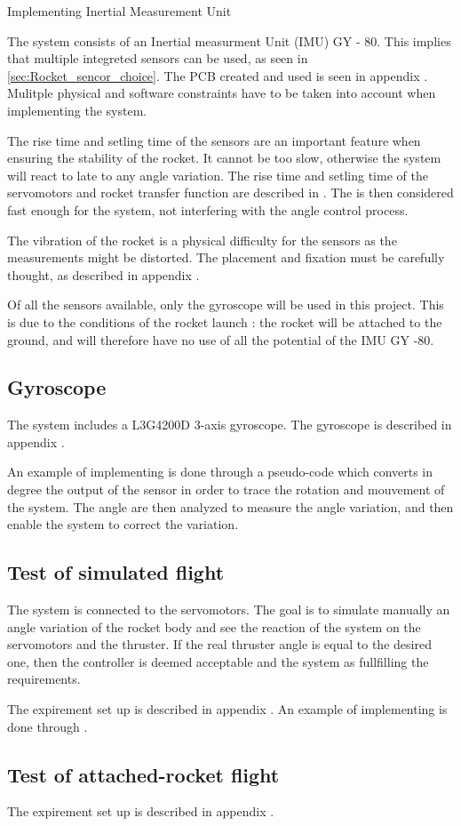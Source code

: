 Implementing Inertial Measurement Unit


The system consists of an Inertial measurment Unit (IMU) GY - 80. This implies that multiple integreted sensors can be used, as seen in \autoref{sec:Rocket_sencor_choice}. The PCB created and used is seen in appendix . 
Mulitple physical and software constraints have to be taken into account when implementing the system.

The rise time and setling time of the sensors are an important feature when ensuring the stability of the rocket. It cannot be too slow, otherwise the system will react to late to any angle variation. The rise time and setling time of the servomotors and rocket transfer function are described in . The is then considered fast enough for the system, not interfering with the angle control process.

The vibration of the rocket is a physical difficulty for the sensors as the measurements might be distorted. The placement and fixation must be carefully thought, as described in appendix .

Of all the sensors available, only the gyroscope will be used in this project. This is due to the conditions of the rocket launch : the rocket will be attached to the ground, and will therefore have no use of all the potential of the IMU GY -80.

\subsection*{Gyroscope}

The system includes a L3G4200D 3-axis gyroscope. The gyroscope is described in appendix . 

An example of implementing is done through a pseudo-code which converts in degree the output of the sensor in order to trace the rotation and mouvement of the system. The angle are then analyzed to measure the angle variation, and then enable the system to correct the variation.

\subsection{Test of simulated flight}

The system is connected to the servomotors. The goal is to simulate manually an angle variation of the rocket body and see the reaction of the system on the servomotors and the thruster. If the real thruster angle is equal to the desired one, then the controller is deemed acceptable and the system as fullfilling the requirements.

The expirement set up is described in appendix . An example of implementing is done through 
.

\subsection{Test of attached-rocket flight}

The expirement set up is described in appendix . 